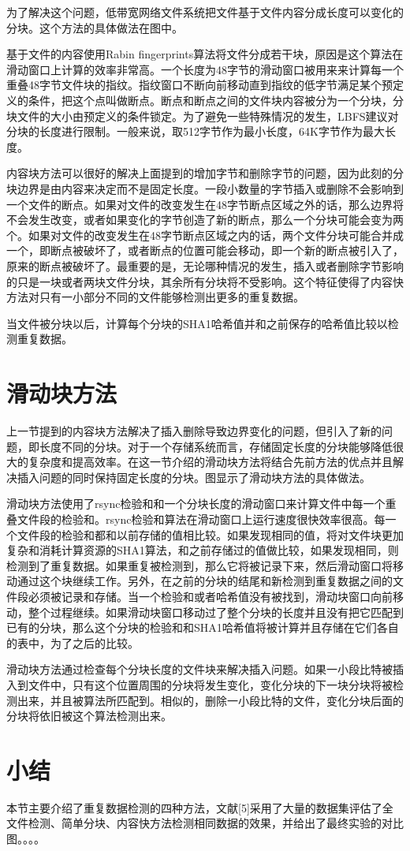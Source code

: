 为了解决这个问题，低带宽网络文件系统把文件基于文件内容分成长度可以变化的分块。这个方法的具体做法在图中。

基于文件的内容使用Rabin fingerprints算法将文件分成若干块，原因是这个算法在滑动窗口上计算的效率非常高。一个长度为48字节的滑动窗口被用来来计算每一个重叠48字节文件块的指纹。指纹窗口不断向前移动直到指纹的低字节满足某个预定义的条件，把这个点叫做断点。断点和断点之间的文件块内容被分为一个分块，分块文件的大小由预定义的条件锁定。为了避免一些特殊情况的发生，LBFS建议对分块的长度进行限制。一般来说，取512字节作为最小长度，64K字节作为最大长度。

内容块方法可以很好的解决上面提到的增加字节和删除字节的问题，因为此刻的分块边界是由内容来决定而不是固定长度。一段小数量的字节插入或删除不会影响到一个文件的断点。如果对文件的改变发生在48字节断点区域之外的话，那么边界将不会发生改变，或者如果变化的字节创造了新的断点，那么一个分块可能会变为两个。如果对文件的改变发生在48字节断点区域之内的话，两个文件分块可能合并成一个，即断点被破坏了，或者断点的位置可能会移动，即一个新的断点被引入了，原来的断点被破坏了。最重要的是，无论哪种情况的发生，插入或者删除字节影响的只是一块或者两块文件分块，其余所有分块将不受影响。这个特征使得了内容快方法对只有一小部分不同的文件能够检测出更多的重复数据。

当文件被分块以后，计算每个分块的SHA1哈希值并和之前保存的哈希值比较以检测重复数据。

\section{滑动块方法}
\label{sec:slidingblock}

上一节提到的内容块方法解决了插入删除导致边界变化的问题，但引入了新的问题，即长度不同的分块。对于一个存储系统而言，存储固定长度的分块能够降低很大的复杂度和提高效率。在这一节介绍的滑动块方法将结合先前方法的优点并且解决插入问题的同时保持固定长度的分块。图显示了滑动块方法的具体做法。

滑动块方法使用了rsync检验和和一个分块长度的滑动窗口来计算文件中每一个重叠文件段的检验和。rsync检验和算法在滑动窗口上运行速度很快效率很高。每一个文件段的检验和都和以前存储的值相比较。如果发现相同的值，将对文件块更加复杂和消耗计算资源的SHA1算法，和之前存储过的值做比较，如果发现相同，则检测到了重复数据。如果重复被检测到，那么它将被记录下来，然后滑动窗口将移动通过这个块继续工作。另外，在之前的分块的结尾和新检测到重复数据之间的文件段必须被记录和存储。当一个检验和或者哈希值没有被找到，滑动块窗口向前移动，整个过程继续。如果滑动块窗口移动过了整个分块的长度并且没有把它匹配到已有的分块，那么这个分块的检验和和SHA1哈希值将被计算并且存储在它们各自的表中，为了之后的比较。

滑动块方法通过检查每个分块长度的文件块来解决插入问题。如果一小段比特被插入到文件中，只有这个位置周围的分块将发生变化，变化分块的下一块分块将被检测出来，并且被算法所匹配到。相似的，删除一小段比特的文件，变化分块后面的分块将依旧被这个算法检测出来。

\section{小结}
本节主要介绍了重复数据检测的四种方法，文献[5]采用了大量的数据集评估了全文件检测、简单分块、内容快方法检测相同数据的效果，并给出了最终实验的对比图。。。。
\label{sec:relatedwork}
